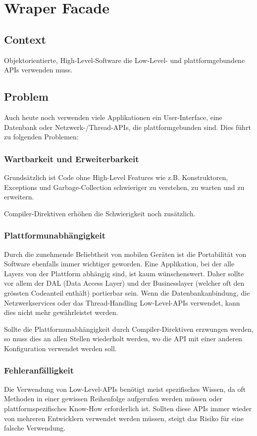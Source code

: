 \chapter{Wraper Facade}

\section{Context}
Objektorientierte, High-Level-Software die Low-Level- und plattformgebundene APIs verwenden muss.

\section{Problem}
Auch heute noch verwenden viele Applikationen ein User-Interface, eine Datenbank oder Netzwerk-/Thread-APIs, die plattformgebunden sind. Dies führt zu folgenden Problemen:

\subsection{Wartbarkeit und Erweiterbarkeit}
Grundsätzlich ist Code ohne High-Level Features wie z.B. Konstruktoren, Exceptions und Garbage-Collection schwieriger zu verstehen, zu warten und zu erweitern.

Compiler-Direktiven erhöhen die Schwierigkeit noch zusätzlich.

\subsection{Plattformunabh\"angigkeit}
Durch die zunehmende Beliebtheit von mobilen Geräten ist die Portabilität von Software ebenfalls immer wichtiger geworden. Eine Applikation, bei der alle Layers von der Plattform abhängig sind, ist kaum wünschenswert. Daher sollte vor allem der DAL (Data Access Layer) und der Businesslayer (welcher oft den grössten Codeanteil enthält) portierbar sein. Wenn die Datenbankanbindung, die Netzwerkservices oder das Thread-Handling Low-Level-APIs verwendet, kann dies nicht mehr gewährleistet werden.

Sollte die Plattformunabhängigkeit durch Compiler-Direktiven erzwungen werden, so muss dies an allen Stellen wiederholt werden, wo die API mit einer anderen Konfiguration verwendet werden soll.

\subsection{Fehleranf\"alligkeit}
Die Verwendung von Low-Level-APIs benötigt meist spezifisches Wissen, da oft Methoden in einer gewissen Reihenfolge aufgerufen werden müssen oder plattformspezifisches Know-How erforderlich ist. Sollten diese APIs immer wieder von mehreren Entwicklern verwendet werden müssen, steigt das Risiko für eine falsche Verwendung.

